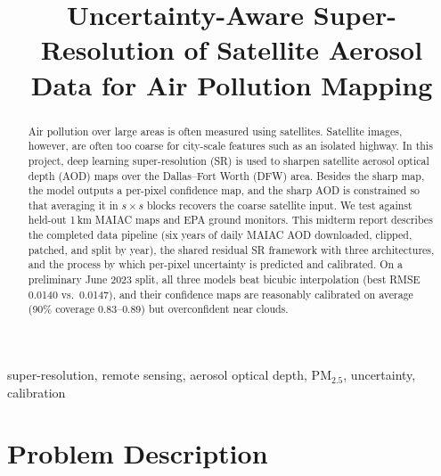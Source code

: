 \documentclass[conference]{IEEEtran}
\begin{document}
\title{Uncertainty-Aware Super-Resolution of Satellite Aerosol Data for Air Pollution Mapping}
\author{
}
\maketitle
\begin{abstract}
Air pollution over large areas is often measured using satellites. Satellite images, however, are often too coarse for city-scale features such as an isolated highway. In this project, deep learning super-resolution (SR) is used to sharpen satellite aerosol optical depth (AOD) maps over the Dallas--Fort Worth (DFW) area. Besides the sharp map, the model outputs a per-pixel confidence map, and the sharp AOD is constrained so that averaging it in \(s\times s\) blocks recovers the coarse satellite input. We test against held-out 1\,km MAIAC maps and EPA ground monitors. This midterm report describes the completed data pipeline (six years of daily MAIAC AOD downloaded, clipped, patched, and split by year), the shared residual SR framework with three architectures, and the process by which per-pixel uncertainty is predicted and calibrated. On a preliminary June 2023 split, all three models beat bicubic interpolation (best RMSE 0.0140 vs.\ 0.0147), and their confidence maps are reasonably calibrated on average (90\% coverage 0.83--0.89) but overconfident near clouds.
\end{abstract}
\begin{IEEEkeywords}
super-resolution, remote sensing, aerosol optical depth, PM$_{2.5}$, uncertainty, calibration
\end{IEEEkeywords}
\section{Problem Description}
\end{document}

